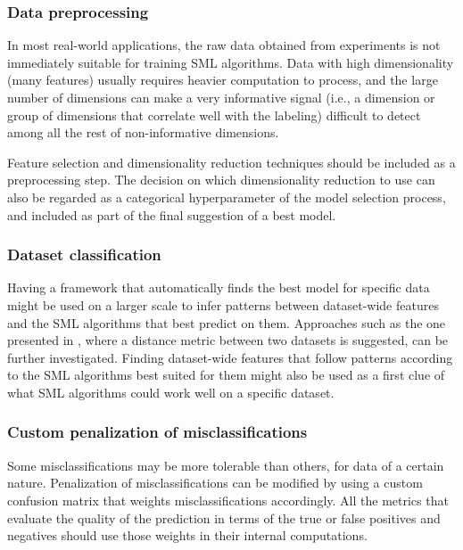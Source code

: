 	\subsubsection{Data preprocessing}
	In most real-world applications, the raw data obtained from experiments is not immediately suitable for
	training SML algorithms. Data with high dimensionality (many features) usually requires heavier computation to
	process, and the large number of dimensions can make a very informative signal (i.e., a
	dimension or group of dimensions that correlate well with the labeling) difficult to detect among
	all the rest of non-informative dimensions.
	
	Feature selection and dimensionality reduction techniques should be included as a preprocessing
	step. The decision on which dimensionality reduction to use can also be regarded as a
	categorical hyperparameter of the model selection process, and included as part of the final
	suggestion of a best model.

	\subsubsection{Dataset classification}
	Having a framework that automatically finds the best model for specific data might be used on a
	larger scale to infer patterns between dataset-wide features and the SML algorithms that best
	predict on them. Approaches such as the one presented in \cite{tatti2007distances}, where a
	distance metric between two datasets is suggested, can be further investigated. Finding
	dataset-wide features that follow patterns according to the SML algorithms best suited for them
	might also be used as a first clue of what SML algorithms could work well on a specific dataset.



	\subsubsection{Custom penalization of misclassifications}
	Some misclassifications may be more tolerable than others, for data of a certain nature.
	Penalization of misclassifications can be modified by using a custom confusion matrix that
	weights misclassifications accordingly. All the metrics that evaluate the quality of the
	prediction in terms of the true or false positives and negatives should use those weights in
	their internal computations.

